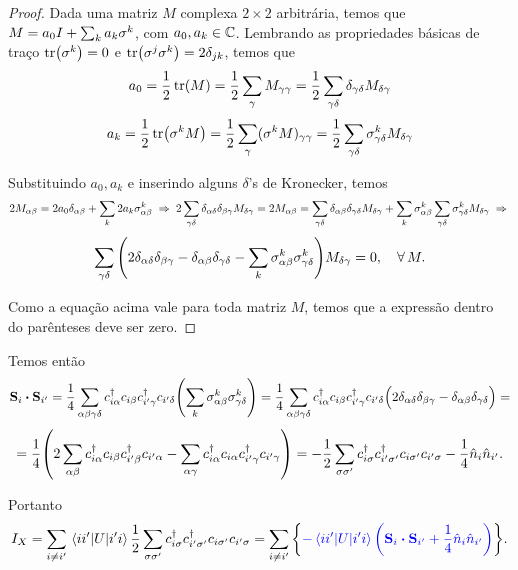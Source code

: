 \documentclass[a4paper,10pt]{article}
\begin{document}
\begin{proof}
Dada uma matriz $M$ complexa $2 \times 2$ arbitrária, temos que $M = a_0 I + \sum_{k} a_k \sigma^k$, com $a_0, a_k \in \mathbb{C}$. Lembrando as propriedades básicas de traço $\tr(\sigma^k) = 0$ e $\tr(\sigma^j \sigma^k) = 2 \delta_{jk}$, temos que
$$
a_0 = \frac{1}{2} \tr(M) =
\frac{1}{2} \sum_{\gamma} M_{\gamma \gamma} =
\frac{1}{2} \sum_{\gamma \delta} \delta_{\gamma \delta} M_{\delta \gamma}
$$
$$
a_k = \frac{1}{2} \tr(\sigma^k M) =
\frac{1}{2} \sum_{\gamma} (\sigma^k M)_{\gamma \gamma} =
\frac{1}{2} \sum_{\gamma \delta}
\sigma^k_{\gamma \delta} M_{\delta \gamma}
$$

Substituindo $a_0, a_k$ e inserindo alguns $\delta$'s de Kronecker, temos
$$
2 M_{\alpha \beta} = 2 a_0 \delta_{\alpha \beta} + \sum_{k} 2 a_k \sigma^k_{\alpha \beta}
\; \Rightarrow \;
2 \sum_{\gamma \delta} \delta_{\alpha \delta} \delta_{\beta \gamma} M_{\delta \gamma}=
2 M_{\alpha \beta} =
\sum_{\gamma \delta} \delta_{\alpha \beta} \delta_{\gamma \delta} M_{\delta \gamma} +
\sum_{k} \sigma^k_{\alpha \beta}
\sum_{\gamma \delta} \sigma^k_{\gamma \delta} M_{\delta \gamma} \; \Rightarrow \;
$$
$$
\sum_{\gamma \delta} \qty(
2 \delta_{\alpha \delta} \delta_{\beta \gamma}
- \delta_{\alpha \beta} \delta_{\gamma \delta}
- \sum_{k} \sigma^k_{\alpha \beta} \sigma^k_{\gamma \delta}
) M_{\delta \gamma} = 0, \quad \forall \, M.
$$

Como a equação acima vale para toda matriz $M$, temos que a expressão dentro do parênteses deve ser zero.
\end{proof}

Temos então
$$
\vb{S}_i \vdot \vb{S}_{i'} =
\frac{1}{4} \sum_{\alpha \beta \gamma \delta}
c_{i\alpha}^\d c_{i\beta} c_{i'\gamma}^\d c_{i'\delta}
\qty( \sum_{k} \s^k_{\alpha \beta} \s^k_{\gamma \delta} )
= \frac{1}{4} \sum_{\alpha \beta \gamma \delta}
c_{i\alpha}^\d c_{i\beta} c_{i'\gamma}^\d c_{i'\delta}
\Big( 2 \delta_{\alpha \delta} \delta_{\beta \gamma}
- \delta_{\alpha \beta} \delta_{\gamma \delta} \Big) =
$$
$$
= \frac{1}{4} \qty( 2 \sum_{\alpha \beta}
c_{i\alpha}^\dagger c_{i\beta} c_{i'\beta}^\dagger c_{i'\alpha}
- \sum_{\alpha \gamma}
c_{i\alpha}^\dagger c_{i\alpha} c_{i'\gamma}^\dagger c_{i'\gamma}
)
= - \frac{1}{2} \sum_{\sigma \sigma'}
c_{i\sigma}^\dagger c_{i'\sigma'}^\dagger c_{i\sigma'} c_{i'\sigma} -
\frac{1}{4} \hat{n}_i \hat{n}_{i'}.
$$

Portanto
$$
I_X =
\sum_{i \neq i'}
\mel{ii'}{U}{i'i} \frac{1}{2} \sum_{\s\s'} c_{i\s}^\d c_{i'\s'}^\d c_{i\s'} c_{i'\s}=
\sum_{i \neq i'}
\qty{ \textcolor{blue}{ - \mel{ii'}{U}{i'i} \qty(
\vb{S}_i \vdot \vb{S}_{i'} + \frac{1}{4} \nn_i \nn_{i'} ) } }.
$$
\end{document}
